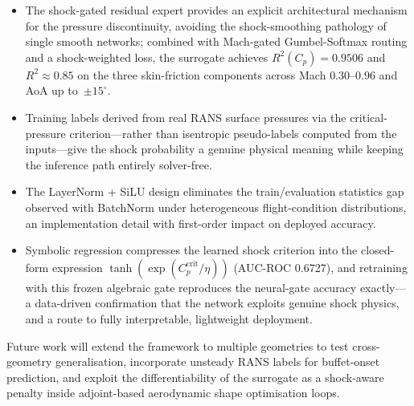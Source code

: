\documentclass{WCCM-ECCOMAS_2026_Full_Paper}
\begin{document}
\begin{itemize}
  \item The shock-gated residual expert provides an explicit
        architectural mechanism for the pressure discontinuity,
        avoiding the shock-smoothing pathology of single smooth
        networks; combined with Mach-gated Gumbel-Softmax routing and
        a shock-weighted loss, the surrogate achieves
        $R^{2}(C_p)=0.9506$ and $R^{2}\approx 0.85$ on the three
        skin-friction components across Mach $0.30$--$0.96$ and
        AoA up to~$\pm 15^{\circ}$.
  \item Training labels derived from real RANS surface pressures via
        the critical-pressure criterion---rather than isentropic
        pseudo-labels computed from the inputs---give the shock
        probability a genuine physical meaning while keeping the
        inference path entirely solver-free.
  \item The LayerNorm + SiLU design eliminates the train/evaluation
        statistics gap observed with BatchNorm under heterogeneous
        flight-condition distributions, an implementation detail with
        first-order impact on deployed accuracy.
  \item Symbolic regression compresses the learned shock criterion
        into the closed-form expression
        $\tanh(\exp(C_p^{\mathrm{crit}}/\eta))$ (AUC-ROC 0.6727), and
        retraining with this frozen algebraic gate reproduces the
        neural-gate accuracy exactly---a data-driven confirmation
        that the network exploits genuine shock physics, and a route
        to fully interpretable, lightweight deployment.
\end{itemize}

Future work will extend the framework to multiple geometries to test
cross-geometry generalisation, incorporate unsteady RANS labels for
buffet-onset prediction, and exploit the differentiability of the
surrogate as a shock-aware penalty inside adjoint-based aerodynamic
shape optimisation loops.

\end{document}
